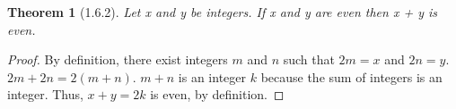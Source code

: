 \documentclass[a4paper, 12pt]{article}
\theoremstyle{plain}
\newtheorem*{theorem*}{Theorem}
\begin{document}
	
	\begin{theorem*}[1.6.2]
		Let x and y be integers. If x and y are even then x + y is even.
	\end{theorem*}
	
	\begin{proof}
		By definition, there exist integers $m$ and $n$ such that $2m = x$ and $2n = y$. 
		$2m + 2n = 2(m + n)$. $m + n$ is an integer $k$ because the sum of integers is an integer. 
		Thus, $x + y = 2k$ is even, by definition.
	\end{proof}
\end{document}
